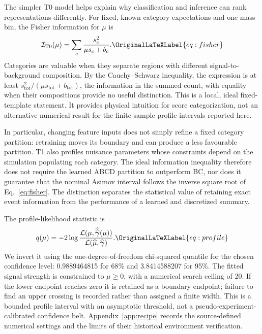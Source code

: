 \documentclass[aps,prd,reprint,superscriptaddress,nofootinbib,longbibliography,floatfix]{revtex4-2}
\let\label\OriginalLaTeXLabel
\begin{document}
The simpler T0 model helps explain why classification and inference can
rank representations differently. For fixed, known category expectations
and one mass bin, the Fisher information for $\mu$ is
\begin{equation}
 \mathcal I_{\mathrm{T0}}(\mu)=\sum_c
                 \frac{s_c^2}{\mu s_c+b_c}.
 \label{eq:fisher}
\end{equation}
Categories are valuable when they separate regions with different
signal-to-background composition. By the Cauchy--Schwarz inequality,
the expression is at least $s_{\mathrm{tot}}^2/
(\mu s_{\mathrm{tot}}+b_{\mathrm{tot}})$, the information in the summed
count, with equality when their compositions provide no useful
distinction. This is a local, ideal fixed-template statement. It provides
physical intuition for score categorization, not an alternative numerical
result for the finite-sample profile intervals reported here.

In particular, changing feature inputs does not simply refine a fixed
category partition: retraining moves its boundary and can produce a less
favourable partition. T1 also profiles nuisance parameters whose constraints
depend on the simulation populating each category. The ideal information
inequality therefore does not require the learned ABCD partition to
outperform BC, nor does it guarantee that the nominal Asimov
interval follows the inverse square root of Eq.~\eqref{eq:fisher}.
The distinction separates the statistical value of retaining exact event
information from the performance of a learned and discretized summary.

The profile-likelihood statistic is
\begin{equation}
 q(\mu)=-2\log
 \frac{\mathcal L(\mu,\widehat{\widehat{\bm\gamma}}(\mu))}
      {\mathcal L(\widehat\mu,\widehat{\bm\gamma})}.
 \label{eq:profile}
\end{equation}
We invert it using the one-degree-of-freedom chi-squared quantile for the
chosen confidence level\cite{Cowan2011}: 0.9889464815 for 68\% and
3.8414588207 for 95\%. The fitted signal strength is
constrained to $\mu\geq0$, with a numerical search ceiling of 20. If the
lower endpoint reaches zero it is retained as a boundary endpoint; failure
to find an upper crossing is recorded rather than assigned a finite width.
This is a bounded profile interval with an asymptotic threshold, not a
pseudo-experiment-calibrated confidence belt.
Appendix~\ref{app:recipe} records the source-defined numerical settings and
the limits of their historical environment verification.
\end{document}
